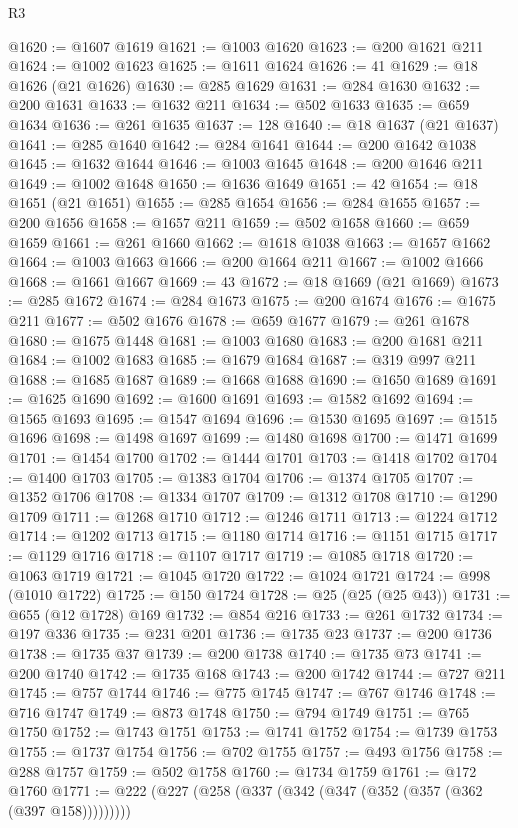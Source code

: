 \begin{lexlean}{R3}
\begin{coremodule}
@1620 := @1607 @1619
@1621 := @1003 @1620
@1623 := @200 @1621 @211
@1624 := @1002 @1623
@1625 := @1611 @1624
@1626 := 41
@1629 := @18 @1626 (@21 @1626)
@1630 := @285 @1629
@1631 := @284 @1630
@1632 := @200 @1631
@1633 := @1632 @211
@1634 := @502 @1633
@1635 := @659 @1634
@1636 := @261 @1635
@1637 := 128
@1640 := @18 @1637 (@21 @1637)
@1641 := @285 @1640
@1642 := @284 @1641
@1644 := @200 @1642 @1038
@1645 := @1632 @1644
@1646 := @1003 @1645
@1648 := @200 @1646 @211
@1649 := @1002 @1648
@1650 := @1636 @1649
@1651 := 42
@1654 := @18 @1651 (@21 @1651)
@1655 := @285 @1654
@1656 := @284 @1655
@1657 := @200 @1656
@1658 := @1657 @211
@1659 := @502 @1658
@1660 := @659 @1659
@1661 := @261 @1660
@1662 := @1618 @1038
@1663 := @1657 @1662
@1664 := @1003 @1663
@1666 := @200 @1664 @211
@1667 := @1002 @1666
@1668 := @1661 @1667
@1669 := 43
@1672 := @18 @1669 (@21 @1669)
@1673 := @285 @1672
@1674 := @284 @1673
@1675 := @200 @1674
@1676 := @1675 @211
@1677 := @502 @1676
@1678 := @659 @1677
@1679 := @261 @1678
@1680 := @1675 @1448
@1681 := @1003 @1680
@1683 := @200 @1681 @211
@1684 := @1002 @1683
@1685 := @1679 @1684
@1687 := @319 @997 @211
@1688 := @1685 @1687
@1689 := @1668 @1688
@1690 := @1650 @1689
@1691 := @1625 @1690
@1692 := @1600 @1691
@1693 := @1582 @1692
@1694 := @1565 @1693
@1695 := @1547 @1694
@1696 := @1530 @1695
@1697 := @1515 @1696
@1698 := @1498 @1697
@1699 := @1480 @1698
@1700 := @1471 @1699
@1701 := @1454 @1700
@1702 := @1444 @1701
@1703 := @1418 @1702
@1704 := @1400 @1703
@1705 := @1383 @1704
@1706 := @1374 @1705
@1707 := @1352 @1706
@1708 := @1334 @1707
@1709 := @1312 @1708
@1710 := @1290 @1709
@1711 := @1268 @1710
@1712 := @1246 @1711
@1713 := @1224 @1712
@1714 := @1202 @1713
@1715 := @1180 @1714
@1716 := @1151 @1715
@1717 := @1129 @1716
@1718 := @1107 @1717
@1719 := @1085 @1718
@1720 := @1063 @1719
@1721 := @1045 @1720
@1722 := @1024 @1721
@1724 := @998 (@1010 @1722)
@1725 := @150 @1724
@1728 := @25 (@25 (@25 @43))
@1731 := @655 (@12 @1728) @169
@1732 := @854 @216
@1733 := @261 @1732
@1734 := @197 @336
@1735 := @231 @201
@1736 := @1735 @23
@1737 := @200 @1736
@1738 := @1735 @37
@1739 := @200 @1738
@1740 := @1735 @73
@1741 := @200 @1740
@1742 := @1735 @168
@1743 := @200 @1742
@1744 := @727 @211
@1745 := @757 @1744
@1746 := @775 @1745
@1747 := @767 @1746
@1748 := @716 @1747
@1749 := @873 @1748
@1750 := @794 @1749
@1751 := @765 @1750
@1752 := @1743 @1751
@1753 := @1741 @1752
@1754 := @1739 @1753
@1755 := @1737 @1754
@1756 := @702 @1755
@1757 := @493 @1756
@1758 := @288 @1757
@1759 := @502 @1758
@1760 := @1734 @1759
@1761 := @172 @1760
@1771 := @222 (@227 (@258 (@337 (@342 (@347 (@352 (@357 (@362 (@397 @158)))))))))

\end{coremodule}
\end{lexlean}
